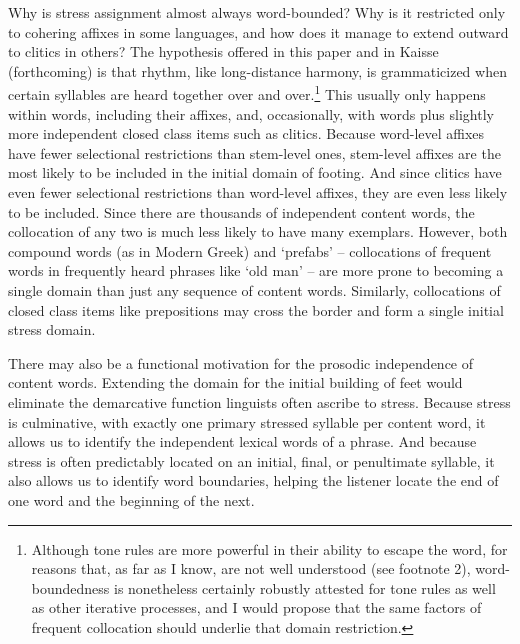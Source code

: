 \documentclass[output=paper,
modfonts
]{LSP/langsci}
\begin{document}
Why is stress assignment almost always word-bounded? Why is it restricted only to cohering affixes in some languages, and how does it manage to extend outward to clitics in others? The hypothesis offered in this paper and in Kaisse (forthcoming) is that rhythm, like long-distance harmony, is grammaticized when certain syllables are heard together over and over.\footnote{Although tone rules are more powerful in their ability to escape the word, for reasons that, as far as I know, are not well understood (see footnote 2), word-boundedness is nonetheless certainly robustly attested for tone rules as well as other iterative processes, and I would propose that the same factors of frequent collocation should underlie that domain restriction.} This usually only happens within words, including their affixes, and, occasionally, with words plus slightly more independent closed class items such as clitics. Because word-level affixes have fewer selectional restrictions than stem-level ones, stem-level affixes are the most likely to be included in the initial domain of footing. And since clitics have even fewer selectional restrictions than word-level affixes, they are even less likely to be included. Since there are thousands of independent content words, the collocation of any two is much less likely to have many exemplars. However, both compound words (as in Modern Greek) and ‘prefabs’ -- collocations of frequent words in frequently heard phrases like ‘old man’ -- are more prone to becoming a single domain than just any sequence of content words. Similarly, collocations of closed class items like prepositions may cross the border and form a single initial stress domain. 

There may also be a functional motivation for the prosodic independence of content words. Extending the domain for the initial building of feet would eliminate the demarcative function linguists often ascribe to stress. Because stress is culminative, with exactly one primary stressed syllable per content word, it allows us to identify the independent lexical words of a phrase. And because stress is often predictably located on an initial, final, or penultimate syllable, it also allows us to identify word boundaries, helping the listener locate the end of one word and the beginning of the next. 
\end{document}
